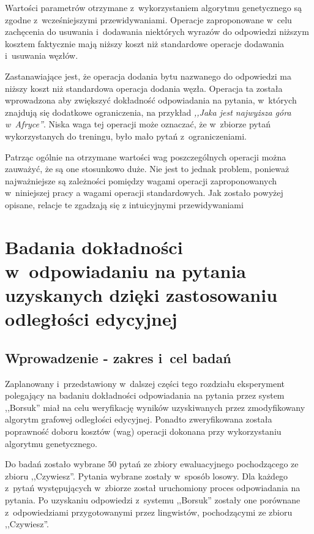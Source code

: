 \documentclass[a4paper, twoside, 12pt]{report}
\begin{document}
        Wartości parametrów otrzymane z~wykorzystaniem algorytmu genetycznego są zgodne z~wcześniejszymi przewidywaniami.
        Operacje zaproponowane w~celu zachęcenia do usuwania i~dodawania niektórych wyrazów do odpowiedzi niższym kosztem
        faktycznie mają niższy koszt niż standardowe operacje dodawania i~usuwania węzłów.

        Zastanawiające jest, że operacja dodania bytu nazwanego do odpowiedzi ma niższy koszt niż standardowa operacja
        dodania węzła. Operacja ta została wprowadzona aby zwiększyć dokładność odpowiadania na pytania, w~których
        znajdują się dodatkowe ograniczenia, na przykład \emph{,,Jaka jest najwyższa góra w~Afryce''}. Niska waga tej
        operacji może oznaczać, że w~zbiorze pytań wykorzystanych do treningu, było mało pytań z~ograniczeniami.

        Patrząc ogólnie na otrzymane wartości wag poszczególnych operacji można zauważyć, że są one stosunkowo duże.
        Nie jest to jednak problem, ponieważ najważniejsze są zależności pomiędzy wagami operacji zaproponowanych
        w~niniejszej pracy a wagami operacji standardowych. Jak zostało powyżej opisane, relacje te zgadzają się z
        intuicyjnymi przewidywaniami

\chapter{Badania dokładności w~odpowiadaniu na pytania uzyskanych dzięki zastosowaniu odległości edycyjnej}
    \section{Wprowadzenie - zakres i~cel badań}
        Zaplanowany i~przedstawiony w~dalszej części tego rozdziału eksperyment polegający na badaniu dokładności
        odpowiadania na pytania przez system ,,Borsuk'' miał na celu weryfikację wyników uzyskiwanych przez zmodyfikowany
        algorytm grafowej odległości edycyjnej. Ponadto zweryfikowana została poprawność doboru kosztów (wag) operacji
        dokonana przy wykorzystaniu algorytmu genetycznego.

        Do badań zostało wybrane 50 pytań ze zbiory ewaluacyjnego pochodzącego ze zbioru ,,Czywiesz''. Pytania wybrane
        zostały w~sposób losowy. Dla każdego z~pytań występujących w~zbiorze został uruchomiony proces odpowiadania
        na pytania. Po uzyskaniu odpowiedzi z~systemu ,,Borsuk'' zostały one porównane z~odpowiedziami przygotowanymi
        przez lingwistów, pochodzącymi ze zbioru ,,Czywiesz''.
\end{document}
